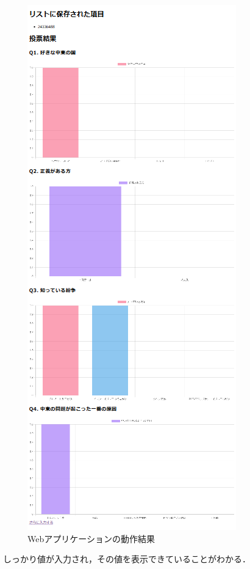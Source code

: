 \documentclass[titlepage,a4paper]{jsarticle}
\begin{document}
\begin{figure}[H]
  \begin{minipage}[t]{0.45\textwidth}
    \centering
    \includegraphics[height=0.5\textheight]{img/move/web3.png}  %
  \end{minipage}
  \caption{Webアプリケーションの動作結果}
  \label{webfig}
\end{figure}
しっかり値が入力され，その値を表示できていることがわかる．
\end{document}
